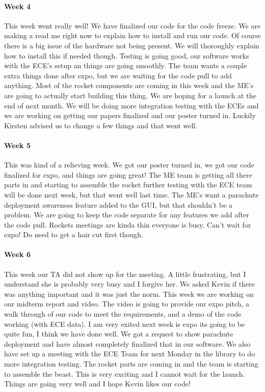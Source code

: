 \documentclass[10pt,draftclsnofoot,onecolumn,retainorgcmds]{IEEEtran}
\begin{document}
\paragraph{Week 4}
This week went really well! We have finalized our code for the code freeze. We are making a read me right now to explain how to install and run our code. Of course there is a big issue of the hardware not being present. We will thoroughly explain how to install this if needed though. Testing is going good, our software works with the ECE's setup an things are going smoothly. The team wants a couple extra things done after expo, but we are waiting for the code pull to add anything. Most of the rocket components are coming in this week and the ME's are going to actually start building this thing. We are hoping for a launch at the end of next month. We will be doing more integration testing with the ECEs and we are working on getting our papers finalized and our poster turned in. Luckily Kirsten advised us to change a few things and that went well. \
\paragraph{Week 5}
This was kind of a relieving week. We got our poster turned in, we got our code finalized for expo, and things are going great! The ME team is getting all there parts in and starting to assemble the rocket further testing with the ECE team will be done next week, but that went well last time. The ME's want a parachute deployment awareness feature added to the GUI, but that shouldn't be a problem. We are going to keep the code separate for any features we add after the code pull. Rockets meetings are kinda thin everyone is busy. Can't wait for expo! Do need to get a hair cut first though.\\
\paragraph{Week 6}
This week our TA did not show up for the meeting. A little frustrating, but I understand she is probably very busy and I forgive her. We asked Kevin if there was anything important and it was just the norm. This week we are working on our midterm report and video. The video is going to provide our expo pitch, a walk through of our code to meet the requirements, and a demo of the code working (with ECE data). I am very exited next week is expo its going to be quite fun, I think we have done well. We got a request to show parachute deployment and have almost completely finalized that in our software. We also have set up a meeting with the ECE Team for next Monday in the library to do more integration testing. The rocket parts are coming in and the team is starting to assemble the beast. This is very exciting and I cannot wait for the launch. Things are going very well and I hope Kevin likes our code!\\
\end{document}
